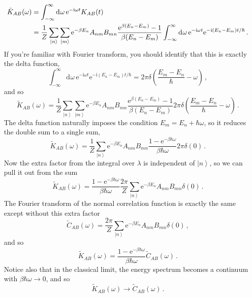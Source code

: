 \documentclass{article}
\theoremstyle{plain}\theoremheaderfont{\normalfont\itshape}\theorembodyfont{\rmfamily}\theoremseparator{.}\newtheorem*{rem}{Remark}\newtheorem*{ex}{Example}\newtheorem*{proof}{Proof}\newtheorem*{altp}{Alternative proof}
\theoremstyle{plain}\theoremheaderfont{\normalfont\bfseries}\theorembodyfont{\rmfamily}\theoremseparator{.}\newtheorem{thm}{Theorem}[section]\newtheorem{lem}[thm]{Lemma}\newtheorem{prop}[thm]{Proposition}\newtheorem*{cor}{Corollary}\newtheorem{defn}[thm]{Definition}\newtheorem{clm}[thm]{Claim}\newtheorem{clminproof}{Claim}
\theoremstyle{break}\theoremheaderfont{\normalfont\itshape}\theorembodyfont{\rmfamily}\theoremseparator{.\medskip}\newtheorem*{proofskip}{Proof}\newtheorem*{exs}{Examples}\newtheorem*{rems}{Remarks}
\theoremstyle{break}\theoremheaderfont{\normalfont\bfseries}\theorembodyfont{\rmfamily}\theoremseparator{.\medskip}\newtheorem{lemskip}[thm]{Lemma}\newtheorem{defnskip}[thm]{Definition}\newtheorem{propskip}[thm]{Proposition}\newtheorem{thmskip}[thm]{Theorem}
\numberwithin{equation}{section}
\newcommand{\ii}{\mathrm{i}}
\newcommand{\ee}{\mathrm{e}}
\newcommand{\dd}[2][]{\mathrm{d}^{#1} #2\,}
\newcommand{\ket}[1]{\left| #1 \right\rangle}
\begin{document}
    \begin{align}
        \tilde{K}_{AB}(\omega)&=\int_{-\infty}^{\infty}\dd{\omega} \ee^{-\ii\omega t}K_{AB}(t)\notag \\
        &=\frac{1}{Z}\sum_{\ket{n}}\sum_{\ket{m}}\ee^{-\beta E_n}A_{nm}B_{mn}\frac{\ee^{\beta(E_n-E_m)}-1}{\beta(E_n-E_m)}\int_{-\infty}^{\infty}\dd{\omega}\ee^{-\ii\omega t}\ee^{-\ii(E_n-E_m)t/\hbar}\,.
    \end{align}
    If you're familiar with Fourier transform, you should identify that this is exactly the delta function,
    \begin{equation}
        \int_{-\infty}^{\infty}\dd{\omega}\ee^{-\ii\omega t}\ee^{-\ii(E_n-E_m)t/\hbar}=2\pi\delta\left(\frac{E_m-E_n}{\hbar}-\omega\right)\,,
    \end{equation}
    and so
    \begin{equation}
        \tilde{K}_{AB}(\omega)=\frac{1}{Z}\sum_{\ket{n}}\sum_{\ket{m}}\ee^{-\beta E_n}A_{nm}B_{mn}\frac{\ee^{\beta(E_n-E_m)}-1}{\beta(E_n-E_m)}2\pi\delta\left(\frac{E_m-E_n}{\hbar}-\omega\right)\,.
    \end{equation}
    The delta function naturally imposes the condition \(E_m=E_n+\hbar\omega\), so it reduces the double sum to a single sum,
    \begin{equation}
        \tilde{K}_{AB}(\omega)=\frac{1}{Z}\sum_{\ket{n}}\ee^{-\beta E_n}A_{nm}B_{mn}\frac{1-\ee^{-\beta\hbar\omega}}{\beta\hbar\omega}2\pi\delta(0)\,.
    \end{equation}
    Now the extra factor from the integral over \(\lambda\) is independent of \(\ket{n}\), so we can pull it out from the sum
    \begin{equation}
        \tilde{K}_{AB}(\omega)=\frac{1-\ee^{-\beta\hbar\omega}}{\beta\hbar\omega}\frac{2\pi}{Z}\sum_{\ket{n}}\ee^{-\beta E_n}A_{nm}B_{mn}\delta(0)\,.
    \end{equation}
    The Fourier transform of the normal correlation function is exactly the same except without this extra factor
    \begin{equation}
        \tilde{C}_{AB}(\omega)=\frac{2\pi}{Z}\sum_{\ket{n}}\ee^{-\beta E_n}A_{nm}B_{mn}\delta(0)\,,
    \end{equation}
    and so
    \begin{equation}
        \tilde{K}_{AB}(\omega)=\frac{1-\ee^{-\beta\hbar\omega}}{\beta\hbar\omega}\tilde{C}_{AB}(\omega)\,.
    \end{equation}
    Notice also that in the classical limit, the energy spectrum becomes a continuum with \(\beta\hbar\omega\to 0\), and so
    \begin{equation}
        \tilde{K}_{AB}(\omega)\to \tilde{C}_{AB}(\omega)\,.
    \end{equation}
    
\end{document}
